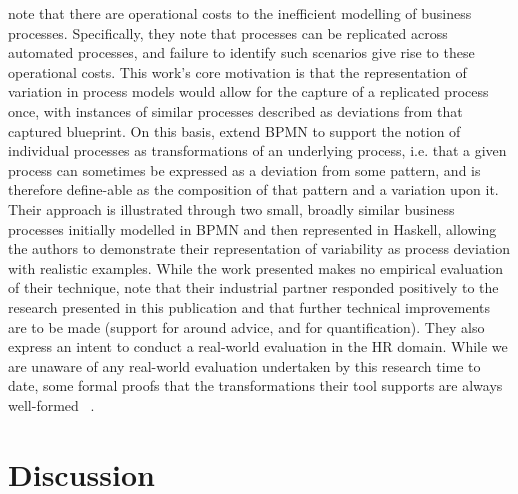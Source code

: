 \citeauthor{Machado_2011} note that there are operational costs to the
inefficient modelling of business processes. Specifically, they note that
processes can be replicated across automated processes, and failure to identify
such scenarios give rise to these operational costs. This work's core motivation
is that the representation of variation in process models would allow for the
capture of a replicated process once, with instances of similar processes
described as deviations from that captured blueprint. On this basis,
\citeauthor{Machado_2011} extend BPMN to support the notion of individual
processes as transformations of an underlying process, i.e. that a given process
can sometimes be expressed as a deviation from some pattern, and is therefore
define-able as the composition of that pattern and a variation upon it. Their
approach is illustrated through two small, broadly similar business processes
initially modelled in BPMN and then represented in Haskell, allowing the authors
to demonstrate their representation of variability as process deviation with
realistic examples. While the work presented makes no empirical evaluation of
their technique, \citeauthor{Machado_2011} note that their industrial partner
responded positively to the research presented in this publication and that
further technical improvements are to be made (support for around advice, and
for quantification). They also express an intent to conduct a real-world
evaluation in the HR domain. While we are unaware of any real-world evaluation
undertaken by this research time to date, some formal proofs that the
transformations their tool supports are always well-formed ~\cite{machado2012formal}.


\section{Discussion}\label{sec:lit_discussion}


